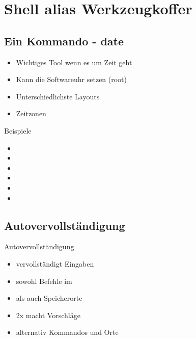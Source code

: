 \documentclass[aspectratio=43]{beamer}
\begin{document}
\section{Shell alias Werkzeugkoffer}
\subsection{Ein Kommando - date}
\begin{frame} 


	\begin{block}{} 
	\begin{itemize}
	\item Wichtiges Tool wenn es um Zeit geht
	\item Kann die Softwareuhr setzen (root)
	\item Unterschiedlichste Layouts
	\item Zeitzonen 
	\end{itemize}
	\end{block}

\end{frame}

\begin{frame} 


	\begin{exampleblock}{Beispiele} 
	\begin{itemize}
	\item {}
	\item {}
	\item {}
	\item {}
	\item {}
	\item {}
	\end{itemize}
	\end{exampleblock}

\end{frame}

\subsection{Autovervollständigung}
\begin{frame} 

	\begin{block}{Autovervollständigung} 
	\begin{itemize}
	\item \taste{$\leftrightharpoons\quad$}  vervollständigt Eingaben
	\item sowohl Befehle im 
	\item als auch Speicherorte 
	\item 2x \taste{$\leftrightharpoons\quad$} macht Vorschläge
	\item alternativ  Kommandos und \taste{/} Orte
	\end{itemize}
	\end{block}

\end{frame}
\end{document}
